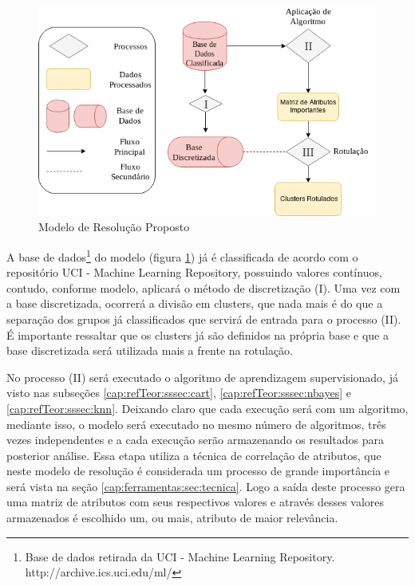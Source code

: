 \begin{figure}[h!]
        \centering
        \includegraphics[scale=0.6]{figs/modeloResolucao.png}
        \caption{Modelo de Resolução Proposto} \label{fig:modeloresolucao}
\end{figure}

A base de dados\footnote{Base de dados retirada da UCI - Machine Learning Repository. http://archive.ics.uci.edu/ml/} do modelo (figura \ref{fig:modeloresolucao}) já é classificada de acordo com o repositório UCI - Machine Learning Repository, possuindo valores contínuos, contudo, conforme modelo, aplicará o método de discretização (I). Uma vez com a base discretizada, ocorrerá a divisão em clusters, que nada mais é do que a separação dos grupos já classificados que servirá de entrada para o processo (II). É importante ressaltar que  os clusters já são definidos na própria base e que a base discretizada será utilizada mais a frente na rotulação. 

No processo (II) será executado o algoritmo de aprendizagem supervisionado, já visto nas subseções \ref{cap:refTeor:sssec:cart}, \ref{cap:refTeor:sssec:nbayes} e \ref{cap:refTeor:sssec:knn}. Deixando claro que cada execução será com um algoritmo, mediante isso, o modelo será executado no mesmo número de algoritmos, três vezes independentes e a cada execução serão armazenando os resultados para posterior análise. Essa etapa utiliza a técnica de correlação de atributos, que neste modelo de resolução é considerada um processo de grande importância e será vista na seção   \ref{cap:ferramentas:sec:tecnica}. Logo a saída deste processo gera uma matriz de atributos com seus respectivos valores e através desses valores armazenados é escolhido um, ou mais, atributo de maior relevância. 

